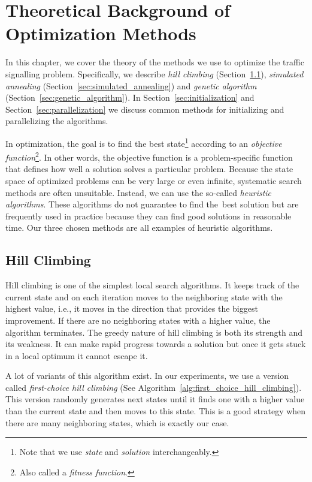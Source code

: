 \chapter{Theoretical Background of Optimization Methods}

In this chapter, we cover the theory of the methods we use to optimize the traffic signalling problem. Specifically, we describe \textit{hill climbing} (Section~\ref{sec:hill_climbing}), \textit{simulated annealing} (Section~\ref{sec:simulated_annealing}) and \textit{genetic algorithm} (Section~\ref{sec:genetic_algorithm}). In Section~\ref{sec:initialization} and Section~\ref{sec:parallelization} we discuss common methods for initializing and parallelizing the algorithms.

In optimization, the goal is to find the best state\footnote{Note that we use \textit{state} and \textit{solution} interchangeably.} according to an \textit{objective function}\footnote{Also called a \textit{fitness function}.}. In other words, the objective function is a problem-specific function that defines how well a solution solves a particular problem.
Because the state space of optimized problems can be very large or even infinite, systematic search methods are often unsuitable. Instead, we can use the so-called \textit{heuristic algorithms}. These algorithms do not guarantee to find
the~best
solution but are frequently used in practice because they can find good solutions in reasonable time. Our three chosen methods are all examples of heuristic algorithms.

\section{Hill Climbing} \label{sec:hill_climbing}

Hill climbing \cite{russell2020artificial, luke2013essentials} is one of the simplest local search algorithms. It keeps track of the current state and on each iteration moves to the neighboring state with the highest value, i.e., it moves in the direction that provides the biggest improvement. If there are no neighboring states with a higher value, the algorithm terminates. The greedy nature of hill climbing is both its strength and its weakness. It can make rapid progress towards a solution but once it gets stuck in a local optimum it cannot escape it.

A lot of variants of this algorithm exist. In our experiments, we use a version called \textit{first-choice hill climbing} (See Algorithm~\ref{alg:first_choice_hill_climbing}). This version randomly generates next states until it finds one with a higher value than the current state and then moves to this state. This is a good strategy when there are many neighboring states, which is exactly our case.


